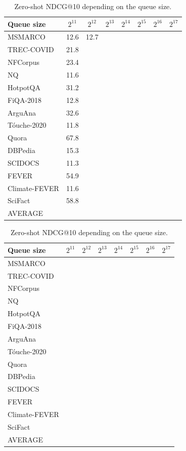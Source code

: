 \begin{table}[t!]
    \small
    \center
    \begin{tabular}{@{}l  c c c c c c c @{}}
        \toprule
        \textbf{Queue size} & $2^{11}$ & $2^{12}$ & $2^{13}$ & $2^{14}$ & $2^{15}$ & $2^{16}$ & $2^{17}$ \\
        \midrule
   MSMARCO       & 12.6	& 12.7 & \\
   TREC-COVID    & 21.8 & \\
   NFCorpus      & 23.4 & \\
   NQ            & 11.6 & \\
   HotpotQA      & 31.2 & \\
   FiQA-2018     & 12.8 & \\
   ArguAna       & 32.6 & \\
   T\'ouche-2020 & 11.8 & \\
   Quora         & 67.8 & \\
   DBPedia       & 15.3 & \\
   SCIDOCS       & 11.3 & \\
   FEVER         & 54.9 & \\
   Climate-FEVER & 11.6 & \\
   SciFact       & 58.8 & \\
   \midrule
   AVERAGE       &  \\
   \bottomrule
    \end{tabular}
    \caption{Zero-shot NDCG@10 depending on the queue size.}
    \label{tab:ndcg_zs_queue_size}
\end{table}

\begin{table}[t!]
    \small
    \center
    \begin{tabular}{@{}l  c c c c c c c @{}}
        \toprule
        \textbf{Queue size} & $2^{11}$ & $2^{12}$ & $2^{13}$ & $2^{14}$ & $2^{15}$ & $2^{16}$ & $2^{17}$ \\
        \midrule
   MSMARCO       & \\
   TREC-COVID    & \\
   NFCorpus      & \\
   NQ            & \\
   HotpotQA      & \\
   FiQA-2018     & \\
   ArguAna       & \\
   T\'ouche-2020 & \\
   Quora         & \\
   DBPedia       & \\
   SCIDOCS       & \\
   FEVER         & \\
   Climate-FEVER & \\
   SciFact       & \\
   \midrule
   AVERAGE       &  \\
   \bottomrule
    \end{tabular}
    \caption{Zero-shot NDCG@10 depending on the queue size.}
    \label{tab:recall_zs_queue_size}
\end{table}
